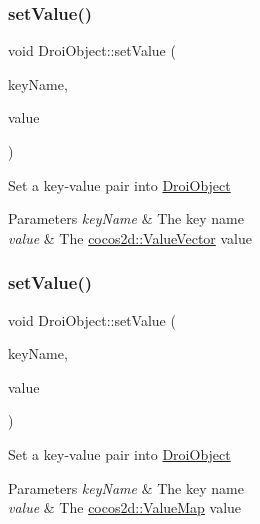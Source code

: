 \subsubsection{\texorpdfstring{set\+Value()}{setValue()}\hspace{0.1cm}{\footnotesize\ttfamily [6/11]}}
{\footnotesize\ttfamily void Droi\+Object\+::set\+Value (\begin{DoxyParamCaption}\item[{const string \&}]{key\+Name,  }\item[{const cocos2d\+::\+Value\+Vector \&}]{value }\end{DoxyParamCaption})}

Set a key-\/value pair into \hyperlink{class_droi_object}{Droi\+Object} 
\begin{DoxyParams}{Parameters}
{\em key\+Name} & The key name \\
\hline
{\em value} & The \hyperlink{}{cocos2d\+::\+Value\+Vector} value \\
\hline
\end{DoxyParams}
\mbox{\label{class_droi_object_ad4bda48ac7796b5ad5fa1d1967e71e5a}} 
\subsubsection{\texorpdfstring{set\+Value()}{setValue()}\hspace{0.1cm}{\footnotesize\ttfamily [7/11]}}
{\footnotesize\ttfamily void Droi\+Object\+::set\+Value (\begin{DoxyParamCaption}\item[{const string \&}]{key\+Name,  }\item[{const cocos2d\+::\+Value\+Map \&}]{value }\end{DoxyParamCaption})}

Set a key-\/value pair into \hyperlink{class_droi_object}{Droi\+Object} 
\begin{DoxyParams}{Parameters}
{\em key\+Name} & The key name \\
\hline
{\em value} & The \hyperlink{}{cocos2d\+::\+Value\+Map} value \\
\hline
\end{DoxyParams}
\mbox{\label{class_droi_object_ae90ad170db569ac77b92b737f5006c80}} 
